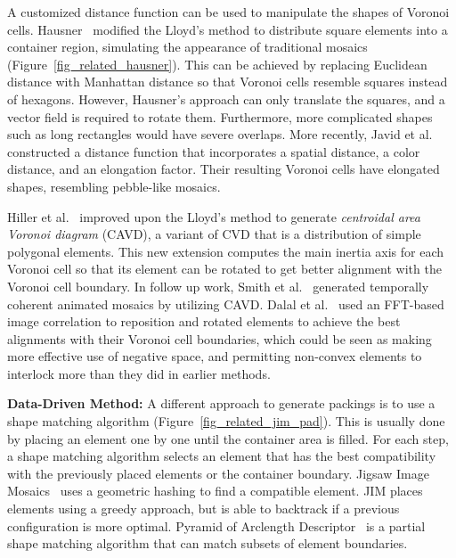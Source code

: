 \newtext
{
A customized distance function can be used to manipulate the shapes of Voronoi cells.
Hausner~\cite{Hausner2001} modified the Lloyd's method to distribute square elements into a container 
region, simulating the appearance of traditional mosaics (Figure~\ref{fig_related_hausner}). 
This can be achieved by replacing Euclidean distance with Manhattan distance so that Voronoi cells resemble squares instead of hexagons.
However, Hausner's approach can only translate the squares, and a vector field is required to rotate them.
Furthermore, more complicated shapes such as long rectangles would have severe overlaps.
More recently, Javid et al.~\cite{Javid2019} constructed a distance function that 
incorporates a spatial distance, a color distance, and an elongation factor. Their resulting
Voronoi cells have elongated shapes, resembling pebble-like mosaics.}

\newtext
{Hiller et al.~\cite{Hiller2003} improved upon the Lloyd's method to generate \textit{centroidal area Voronoi diagram} (CAVD),
a variant of CVD that is a distribution of simple polygonal elements.
This new extension computes the main inertia axis for each Voronoi cell so that 
its element can be rotated to get better alignment with the Voronoi cell boundary.
In follow up work, Smith et al.~\cite{Smith2005} generated temporally coherent animated mosaics by utilizing CAVD.
Dalal et al.~\cite{Dalal2006} used an FFT-based image correlation to reposition
and rotated elements to achieve the best alignments with their Voronoi cell boundaries, 
which could be seen as making more effective use of negative
space, and permitting non-convex elements to interlock more than they did in
earlier methods.
}

\newtext
{
\textbf{Data-Driven Method:} 
A different approach to generate packings is to use a shape matching algorithm (Figure~\ref{fig_related_jim_pad}).
This is usually done by placing an element one by one until the container area is filled.
For each step, a shape matching algorithm selects an 
element that has the best compatibility with the previously placed elements or the container boundary.
Jigsaw Image Mosaics~\cite{Kim2002} uses a geometric hashing to find
a compatible element. JIM places elements using a greedy approach, but is able to backtrack 
if a previous configuration is more optimal.
Pyramid of Arclength Descriptor~\cite{Kwan2016} is
a partial shape matching algorithm that can match
subsets of element boundaries.
}

